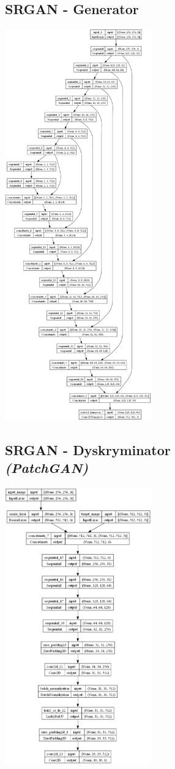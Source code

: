 \documentclass{article}
\begin{document}
\begin{multicols}{2}
\subsection{SRGAN - Generator \vspace{1.25\baselineskip}}
    \includegraphics[width=0.475\textwidth]{../imgs/srgan_generator.png}
\subsection{SRGAN - Dyskryminator \\ \textit{(PatchGAN)}}
    \includegraphics[width=0.475\textwidth]{../imgs/srgan_discriminator.png}
\end{multicols}
\end{document}
